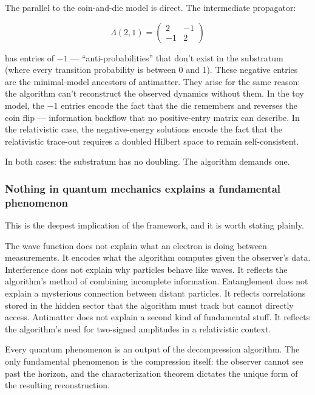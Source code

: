 \documentclass[
]{article}
\begin{document}
The parallel to the coin-and-die model is direct. The intermediate
propagator:

\[\Lambda(2,1) = \begin{pmatrix} 2 & -1 \\ -1 & 2 \end{pmatrix}\]

has entries of \(-1\) --- ``anti-probabilities'' that don't exist in the
substratum (where every transition probability is between 0 and 1).
These negative entries are the minimal-model ancestors of antimatter.
They arise for the same reason: the algorithm can't reconstruct the
observed dynamics without them. In the toy model, the \(-1\) entries
encode the fact that the die remembers and reverses the coin flip ---
information backflow that no positive-entry matrix can describe. In the
relativistic case, the negative-energy solutions encode the fact that
the relativistic trace-out requires a doubled Hilbert space to remain
self-consistent.

In both cases: the substratum has no doubling. The algorithm demands
one.

\hypertarget{nothing-in-quantum-mechanics-explains-a-fundamental-phenomenon}{%
\subsubsection{Nothing in quantum mechanics explains a fundamental
phenomenon}\label{nothing-in-quantum-mechanics-explains-a-fundamental-phenomenon}}

This is the deepest implication of the framework, and it is worth
stating plainly.

The wave function does not explain what an electron is doing between
measurements. It encodes what the algorithm computes given the
observer's data. Interference does not explain why particles behave like
waves. It reflects the algorithm's method of combining incomplete
information. Entanglement does not explain a mysterious connection
between distant particles. It reflects correlations stored in the hidden
sector that the algorithm must track but cannot directly access.
Antimatter does not explain a second kind of fundamental stuff. It
reflects the algorithm's need for two-signed amplitudes in a
relativistic context.

Every quantum phenomenon is an output of the decompression algorithm.
The only fundamental phenomenon is the compression itself: the observer
cannot see past the horizon, and the characterization theorem dictates
the unique form of the resulting reconstruction.
\end{document}

